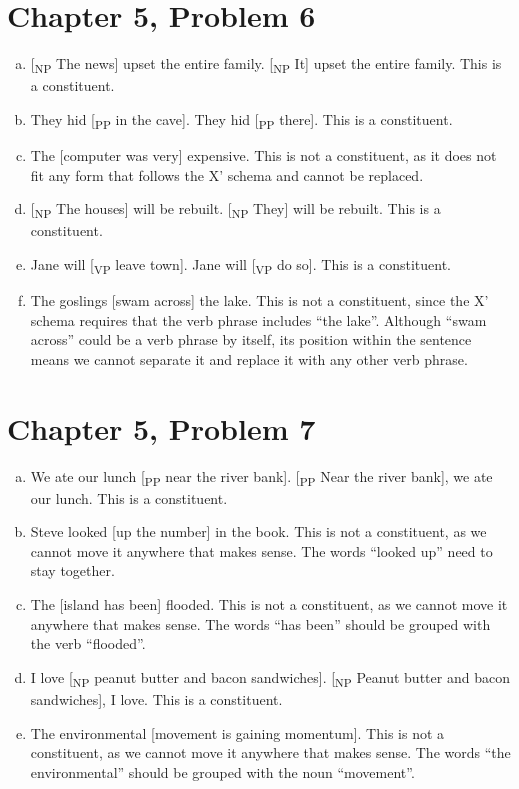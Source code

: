 \documentclass[12pt]{article}
\begin{document}
\section*{Chapter 5, Problem 6}

\begin{enumerate}[a)]
    \item {[\textsubscript{NP} The news] upset the entire family. [\textsubscript{NP} It] upset the entire family. This is a constituent.}
    \item They hid [\textsubscript{PP} in the cave]. They hid [\textsubscript{PP} there]. This is a constituent.
    \item The [computer was very] expensive. This is not a constituent, as it does not fit any form that follows the X' schema and cannot be replaced.
    \item {[\textsubscript{NP} The houses] will be rebuilt. [\textsubscript{NP} They] will be rebuilt. This is a constituent.}
    \item Jane will [\textsubscript{VP} leave town]. Jane will [\textsubscript{VP} do so]. This is a constituent.
    \item The goslings [swam across] the lake. This is not a constituent, since the X' schema requires that the verb phrase includes ``the lake''.
    Although ``swam across'' could be a verb phrase by itself, its position within the sentence means we cannot separate it and replace it with any other verb phrase.
\end{enumerate}

\section*{Chapter 5, Problem 7}

\begin{enumerate}[a)]
    \item We ate our lunch [\textsubscript{PP} near the river bank]. [\textsubscript{PP} Near the river bank], we ate our lunch. This is a constituent.
    \item Steve looked [up the number] in the book. This is not a constituent, as we cannot move it anywhere that makes sense. The words ``looked up'' need to stay together.
    \item The [island has been] flooded. This is not a constituent, as we cannot move it anywhere that makes sense. The words ``has been'' should be grouped with the verb ``flooded''.
    \item I love [\textsubscript{NP} peanut butter and bacon sandwiches]. [\textsubscript{NP} Peanut butter and bacon sandwiches], I love. This is a constituent.
    \item The environmental [movement is gaining momentum]. This is not a constituent, as we cannot move it anywhere that makes sense. The words ``the environmental'' should be grouped with the noun ``movement''.
\end{enumerate}
\end{document}
